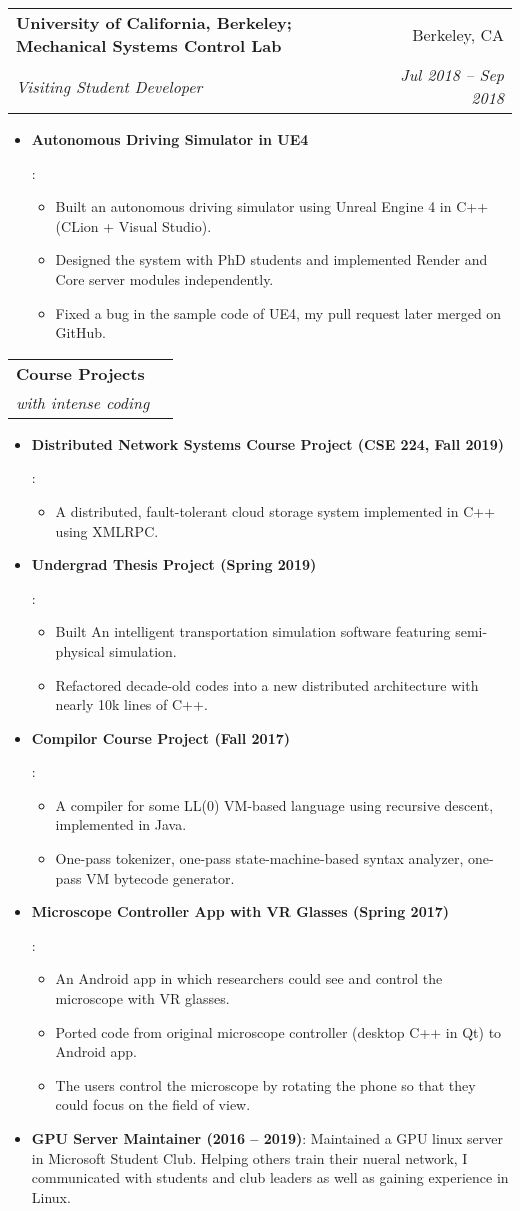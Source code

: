 \documentclass[letterpaper,11pt]{article}
\makeatletter
\newcommand{\resumeItem}[2]{
  \item\small{
    \textbf{#1}{: #2 \vspace{-2pt}}
  }
}
\newcommand{\resumeSubheading}[4]{
  \vspace{-1pt}\item
    \begin{tabular*}{0.97\textwidth}[t]{l@{\extracolsep{\fill}}r}
      \textbf{#1} & #2 \\
      \textit{\small#3} & \textit{\small #4} \\
    \end{tabular*}\vspace{-5pt}
}
\newcommand{\resumeItemListStart}{\begin{itemize}}
\newcommand{\resumeItemListEnd}{\end{itemize}\vspace{-5pt}}
\makeatother
\begin{document}
    \resumeSubheading
      {University of California, Berkeley; Mechanical Systems Control Lab}{Berkeley, CA}
      {Visiting Student Developer}{Jul 2018 -- Sep 2018}
      \resumeItemListStart
        \resumeItem{Autonomous Driving Simulator in UE4}{
          \begin{itemize}
            \item Built an autonomous driving simulator using Unreal Engine 4 in C++ (CLion + Visual Studio).
            \item Designed the system with PhD students and implemented Render and Core server modules independently.
            \item Fixed a bug in the sample code of UE4, my pull request later merged on GitHub.
          \end{itemize}
        }
      \resumeItemListEnd

    \resumeSubheading
      {Course Projects}{}
      {with intense coding}{}
      \resumeItemListStart
        \resumeItem{Distributed Network Systems Course Project (CSE 224, Fall 2019)}{
          \begin{itemize}
            \item A distributed, fault-tolerant cloud storage system implemented in C++ using XMLRPC.
          \end{itemize}
        }
        \resumeItem{Undergrad Thesis Project (Spring 2019)}{
          \begin{itemize}
            \item Built An intelligent transportation simulation software featuring semi-physical simulation.
            \item Refactored decade-old codes into a new distributed architecture with nearly 10k lines of C++.
          \end{itemize}
        }
        \resumeItem{Compilor Course Project (Fall 2017)}{
          \begin{itemize}
            \item A compiler for some LL(0) VM-based language using recursive descent, implemented in Java.
            \item One-pass tokenizer, one-pass state-machine-based syntax analyzer, one-pass VM bytecode generator.
          \end{itemize}
        }
        \resumeItem{Microscope Controller App with VR Glasses (Spring 2017)}{
          \begin{itemize}
            \item An Android app in which researchers could see and control the microscope with VR glasses.
            \item Ported code from original microscope controller (desktop C++ in Qt) to Android app.
            \item The users control the microscope by rotating the phone so that they could focus on the field of view.
          \end{itemize}
        }
        \resumeItem{GPU Server Maintainer (2016 -- 2019)}{
          Maintained a GPU linux server in Microsoft Student Club.
          Helping others train their nueral network, I communicated with students and club leaders as well as gaining experience in Linux.
        }
      \resumeItemListEnd
\end{document}
